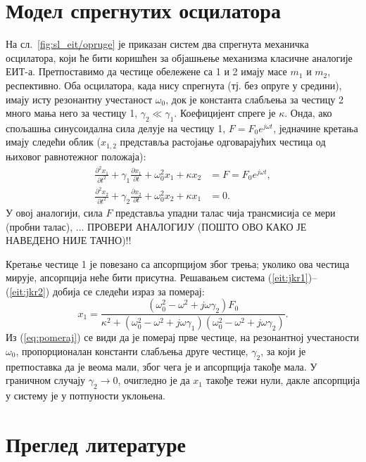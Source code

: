 \documentclass[main.tex]{subfiles}
\begin{document}
\section{Модел спрегнутих осцилатора}%
\label{sec:model_spregnutikh_ostsilatora}

На сл.~\ref{fig:sl_eit/opruge} је приказан систем два спрегнута механичка осцилатора, који ће бити коришћен за објашњење механизма класичне аналогије ЕИТ-а. Претпоставимо да честице обележене са 1 и 2 имају масе $m_1$ и $m_2$, респективно. Оба осцилатора, када нису спрегнута (тј. без опруге у средини), имају исту резонантну учестаност $\omega_0$, док је константа слабљења за честицу 2 много мања него за честицу 1, $\gamma_2\ll\gamma_1$. Коефицијент спреге је $\kappa$. Онда, ако спољашња синусоидална сила делује на честицу 1, $F=F_0e^{j\omega t}$, једначине кретања имају следећи облик ($x_{1,2}$ представља растојање одговарајућих честица од њиховог равнотежног положаја):
\begin{align}
    \frac{\partial^2x_1}{\partial t^2} + \gamma_1 \frac{\partial x_1}{\partial t} + \omega_0^2 x_1 + \kappa x_2 & = F = F_0 e^{j\omega t}, \label{eit:jkr1} \\
    \frac{\partial^2 x_2}{\partial t^2} + \gamma_2 \frac{\partial x_2}{\partial t} + \omega_0^2 x_2 + \kappa x_1 & = 0.\label{eit:jkr2}
\end{align}
У овој аналогији, сила $F$ представља упадни талас чија трансмисија се мери (пробни талас), ... ПРОВЕРИ АНАЛОГИЈУ (ПОШТО ОВО КАКО ЈЕ НАВЕДЕНО НИЈЕ ТАЧНО)!!

Кретање честице 1 је повезано са апсорпцијом због трења; уколико ова честица мирује, апсорпција неће бити присутна. Решавањем система (\ref{eit:jkr1})–(\ref{eit:jkr2}) добија се следећи израз за померај:
\begin{equation}
    \label{eq:pomeraj}
    x_1 = \frac{\left( \omega_0^2 - \omega^2 + j\omega\gamma_2 \right)F_0}{\kappa^2 + \left( \omega_0^2 - \omega^2 + j\omega\gamma_1 \right) \left( \omega_0^2 - \omega^2 + j\omega\gamma_2   \right)}.
\end{equation}
Из (\ref{eq:pomeraj}) се види да је померај прве честице, на резонантној учестаности $\omega_0$, пропорционалан константи слабљења друге честице, $\gamma_2$, за који је претпоставка да је веома мали, због чега је и апсорпција такође мала. У граничном случају $\gamma_2\to 0$, очигледно је да $x_1$ такође тежи нули, дакле апсорпција у систему је у потпуности уклоњена.

\section{Преглед литературе}%
\label{sec:pregled_literature}
\end{document}
